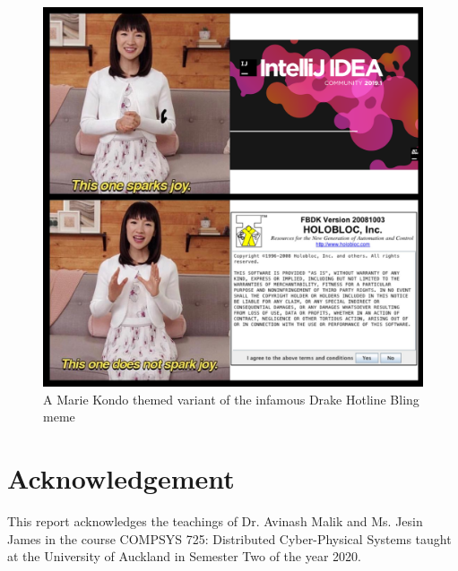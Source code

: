 \documentclass[12pt, conference]{IEEEtran}
\begin{document}
\begin{figure}[htbp]
  \centerline{\includegraphics[width=1.0\textwidth]{725-meme.png}}
  \caption{A Marie Kondo themed variant of the infamous Drake Hotline Bling
  meme}
\label{fig:meme}
\end{figure}

\section*{Acknowledgement}
This report acknowledges the teachings of Dr. Avinash Malik and Ms. Jesin James
in the course COMPSYS 725: Distributed Cyber-Physical Systems taught at the
University of Auckland in Semester Two of the year 2020.
\end{document}
